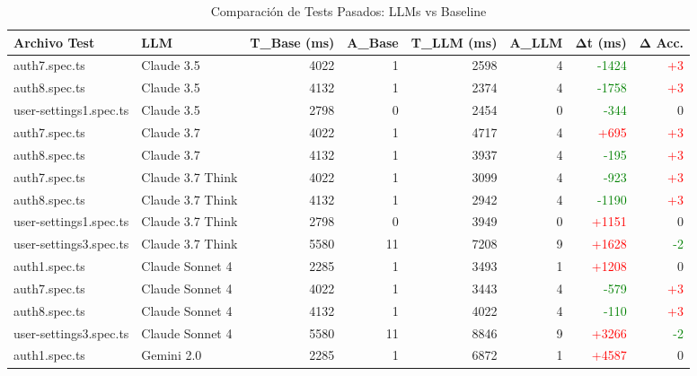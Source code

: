 
\begin{table}[htbp]
\centering
\caption{Comparación de Tests Pasados: LLMs vs Baseline}
\label{tab:test_comparison}
\footnotesize %
\begin{tabular}{|p{3.5cm}|p{2.5cm}|r|r|r|r|r|r|}
\hline
\textbf{Archivo Test} & \textbf{LLM} & \textbf{T\_Base (ms)} & \textbf{A\_Base} & \textbf{T\_LLM (ms)} & \textbf{A\_LLM} & \textbf{Δt (ms)} & \textbf{Δ Acc.} \\
\hline
auth7.spec.ts & Claude 3.5 & 4022 & 1 & 2598 & 4 & \textcolor{green}{-1424} & \textcolor{red}{+3} \\
auth8.spec.ts & Claude 3.5 & 4132 & 1 & 2374 & 4 & \textcolor{green}{-1758} & \textcolor{red}{+3} \\
user-settings1.spec.ts & Claude 3.5 & 2798 & 0 & 2454 & 0 & \textcolor{green}{-344} & 0 \\
\hline
auth7.spec.ts & Claude 3.7 & 4022 & 1 & 4717 & 4 & \textcolor{red}{+695} & \textcolor{red}{+3} \\
auth8.spec.ts & Claude 3.7 & 4132 & 1 & 3937 & 4 & \textcolor{green}{-195} & \textcolor{red}{+3} \\
\hline
auth7.spec.ts & Claude 3.7 Think & 4022 & 1 & 3099 & 4 & \textcolor{green}{-923} & \textcolor{red}{+3} \\
auth8.spec.ts & Claude 3.7 Think & 4132 & 1 & 2942 & 4 & \textcolor{green}{-1190} & \textcolor{red}{+3} \\
user-settings1.spec.ts & Claude 3.7 Think & 2798 & 0 & 3949 & 0 & \textcolor{red}{+1151} & 0 \\
user-settings3.spec.ts & Claude 3.7 Think & 5580 & 11 & 7208 & 9 & \textcolor{red}{+1628} & \textcolor{green}{-2} \\
\hline
auth1.spec.ts & Claude Sonnet 4 & 2285 & 1 & 3493 & 1 & \textcolor{red}{+1208} & 0 \\
auth7.spec.ts & Claude Sonnet 4 & 4022 & 1 & 3443 & 4 & \textcolor{green}{-579} & \textcolor{red}{+3} \\
auth8.spec.ts & Claude Sonnet 4 & 4132 & 1 & 4022 & 4 & \textcolor{green}{-110} & \textcolor{red}{+3} \\
user-settings3.spec.ts & Claude Sonnet 4 & 5580 & 11 & 8846 & 9 & \textcolor{red}{+3266} & \textcolor{green}{-2} \\
\hline
auth1.spec.ts & Gemini 2.0 & 2285 & 1 & 6872 & 1 & \textcolor{red}{+4587} & 0 \\

\end{tabular}
\end{table}
